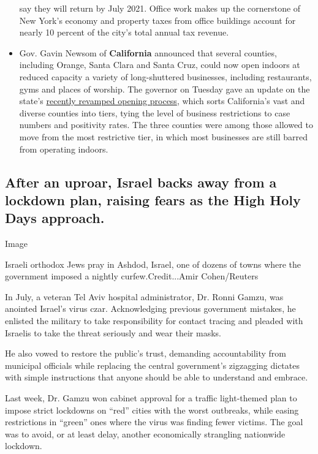 \begin{itemize}
  say they will return by July 2021. Office work makes up the
  cornerstone of New York's economy and property taxes from office
  buildings account for nearly 10 percent of the city's total annual tax
  revenue.
\item
  Gov. Gavin Newsom of \textbf{California} announced that several
  counties, including Orange, Santa Clara and Santa Cruz, could now open
  indoors at reduced capacity a variety of long-shuttered businesses,
  including restaurants, gyms and places of worship. The governor on
  Tuesday gave an update on the state's
  \href{https://www.nytimes3xbfgragh.onion/2020/08/31/us/california-coronavirus-reopening.html}{recently
  revamped opening process}, which sorts California's vast and diverse
  counties into tiers, tying the level of business restrictions to case
  numbers and positivity rates. The three counties were among those
  allowed to move from the most restrictive tier, in which most
  businesses are still barred from operating indoors.
\end{itemize}

\hypertarget{after-an-uproar-israel-backs-away-from-a-lockdown-plan-raising-fears-as-the-high-holy-days-approach}{%
\subsection{After an uproar, Israel backs away from a lockdown plan,
raising fears as the High Holy Days
approach.}\label{after-an-uproar-israel-backs-away-from-a-lockdown-plan-raising-fears-as-the-high-holy-days-approach}}

Image

Israeli orthodox Jews pray in Ashdod, Israel, one of dozens of towns
where the government imposed a nightly curfew.Credit...Amir
Cohen/Reuters

In July, a veteran Tel Aviv hospital administrator, Dr. Ronni Gamzu, was
anointed Israel's virus czar. Acknowledging previous government
mistakes, he enlisted the military to take responsibility for contact
tracing and pleaded with Israelis to take the threat seriously and wear
their masks.

He also vowed to restore the public's trust, demanding accountability
from municipal officials while replacing the central government's
zigzagging dictates with simple instructions that anyone should be able
to understand and embrace.

Last week, Dr. Gamzu won cabinet approval for a traffic light-themed
plan to impose strict lockdowns on ``red'' cities with the worst
outbreaks, while easing restrictions in ``green'' ones where the virus
was finding fewer victims. The goal was to avoid, or at least delay,
another economically strangling nationwide lockdown.

